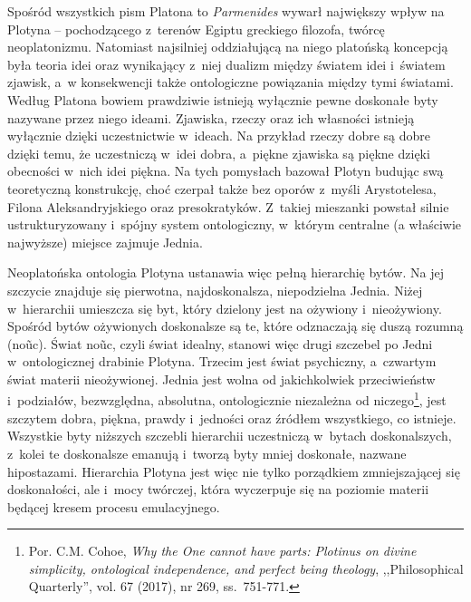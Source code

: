 Spośród wszystkich pism Platona to \textit{Parmenides} wywarł największy wpływ na Plotyna -- pochodzącego z~terenów Egiptu greckiego filozofa, twórcę neoplatonizmu. Natomiast najsilniej oddziałującą na niego platońską koncepcją była teoria idei oraz wynikający z~niej dualizm między światem idei i~światem zjawisk, a~w konsekwencji także ontologiczne powiązania między tymi światami. Według Platona bowiem prawdziwie istnieją wyłącznie pewne doskonałe byty nazywane przez niego ideami. Zjawiska, rzeczy oraz ich własności istnieją wyłącznie dzięki uczestnictwie w~ideach. Na przykład rzeczy dobre są dobre dzięki temu, że uczestniczą w~idei dobra, a~piękne zjawiska są piękne dzięki obecności w~nich idei piękna. Na tych pomysłach bazował Plotyn budując swą teoretyczną konstrukcję, choć czerpał także bez oporów z~myśli Arystotelesa, Filona Aleksandryjskiego oraz presokratyków. Z~takiej mieszanki powstał silnie ustrukturyzowany i~spójny system ontologiczny, w~którym centralne (a właściwie najwyższe) miejsce zajmuje Jednia.

Neoplatońska ontologia Plotyna ustanawia więc pełną hierarchię bytów. Na jej szczycie znajduje się pierwotna, najdoskonalsza, niepodzielna Jednia. Niżej w~hierarchii umieszcza się byt, który dzielony jest na ożywiony i~nieożywiony. Spośród bytów ożywionych doskonalsze są te, które odznaczają się duszą rozumną (\textgreek{no\~uc}). Świat \textgreek{no\~uc}, czyli świat idealny, stanowi więc drugi szczebel po Jedni w~ontologicznej drabinie Plotyna. Trzecim jest świat psychiczny, a~czwartym świat materii nieożywionej. Jednia jest wolna od jakichkolwiek przeciwieństw i~podziałów, bezwzględna, absolutna, ontologicznie niezależna od niczego\footnote{Por. C.M. Cohoe, \textit{Why the One cannot have parts: Plotinus on divine simplicity, ontological independence, and perfect being theology}, ,,Philosophical Quarterly'', vol. 67 (2017), nr 269, ss.~751-771.}, jest szczytem dobra, piękna, prawdy i~jedności oraz źródłem wszystkiego, co istnieje. Wszystkie byty niższych szczebli hierarchii uczestniczą w~bytach doskonalszych, z~kolei te doskonalsze emanują i~tworzą byty mniej doskonałe, nazwane hipostazami. Hierarchia Plotyna jest więc nie tylko porządkiem zmniejszającej się doskonałości, ale i~mocy twórczej, która wyczerpuje się na poziomie materii będącej kresem procesu emulacyjnego.

